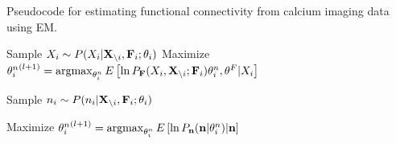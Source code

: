 \begin{algorithm}
\caption{Pseudocode for estimating functional connectivity from calcium imaging data using EM.}\label{eqn:pseudocode}
\begin{algorithmic}
      \State Sample $X_i \sim P(X_i|{\bf X}_{\backslash i}, {\bf F}_i; \mathbf{\theta}_i)$
      \State Maximize ${\mathbf{\theta}^n_i}^{(l+1)}=\operatorname*{argmax}_{\mathbf{\theta}^n_i} E\left[\ln P_{{\bf F}}(X_i, {\bf X}_{\backslash i}; {\bf F}_i) \mathbf{\theta}^n_i, \mathbf{\theta}^F |X_i\right]$
    \EndWhile
  \EndFor
  
      \State Sample $n_i \sim P(n_i|{\bf X}_{\backslash i},{\bf F}_i; \mathbf{\theta}_i)$
    \EndFor
  \EndFor 

  \State Maximize ${\mathbf{\theta}^n_i}^{(l+1)}=\operatorname*{argmax}_{\mathbf{\theta}^n_i} E\left[\ln P_{{\bf n}}({\bf n}|{\mathbf{\theta}^n_i})|{\bf n}\right]$  
\EndWhile
\end{algorithmic}
\end{algorithm}
